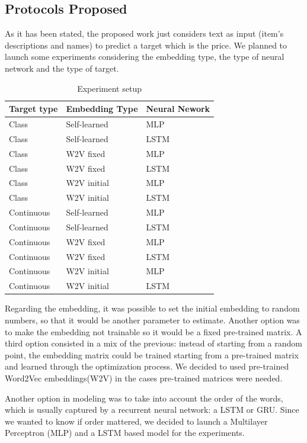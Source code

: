 \documentclass[11pt,letterpaper]{article}
\begin{document}
\subsection{Protocols Proposed}
As it has been stated, the proposed work just considers text as input (item's descriptions and names) to predict a target which is the price. We planned to launch some experiments considering the embedding type, the type of neural network and the type of target.
\begin{table}[ht!]
\centering
\caption{Experiment setup}
\label{table:experiment-setup}
\scalebox{0.8} 
{\begin{tabular}{|l|l|l|}
\hline
\textbf{Target type} & \textbf{Embedding Type} & \textbf{Neural Nework} \\ \hline \hline
Class & Self-learned & MLP \\ \hline
Class & Self-learned & LSTM \\ \hline
Class & W2V fixed & MLP \\ \hline
Class & W2V fixed & LSTM \\ \hline
Class & W2V initial & MLP \\ \hline
Class & W2V initial & LSTM \\ \hline
Continuous & Self-learned & MLP \\ \hline
Continuous & Self-learned & LSTM \\ \hline
Continuous & W2V fixed & MLP \\ \hline
Continuous & W2V fixed & LSTM \\ \hline
Continuous & W2V initial & MLP \\ \hline
Continuous & W2V initial & LSTM \\ \hline \hline
\end{tabular}}
\end{table}

Regarding the embedding, it was possible to set the initial embedding to random numbers, so that it would be another parameter to estimate. Another option was to make the embedding not trainable so it would be a fixed pre-trained matrix. A third option consisted in a mix of the previous: instead of starting from a random point, the embedding matrix could be trained starting from a pre-trained matrix and learned through the optimization process. We decided to used pre-trained Word2Vec embeddings(W2V) in the cases pre-trained matrices were needed. 

Another option in modeling was to take into account the order of the words, which is usually captured by a recurrent neural network: a LSTM or GRU. Since we wanted to know if order mattered, we decided to launch a  Multilayer Perceptron (MLP) and a LSTM based model for the experiments. 
\end{document}
